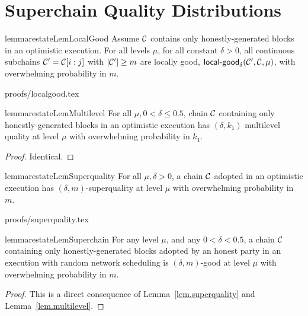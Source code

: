 \section{Superchain Quality Distributions}

\begin{restatable}{lemma}{restateLemLocalGood}
\label{lem.localgood}
Assume $\mathcal{C}$ contains only honestly-generated blocks in an optimistic
execution. For all levels $\mu$, for all constant $\delta > 0$, all continuous
subchains $\mathcal{C}' = \mathcal{C}[i:j]$ with $|\mathcal{C}'| \geq m$ are locally good,
$\textsf{local-good}_{\delta}(\mathcal{C}', \mathcal{C}, \mu)$, with overwhelming
probability in $m$.
\end{restatable}
\ifonecolumn
{proofs/localgood.tex}
\fi

\begin{restatable}{lemma}{restateLemMultilevel}
\label{lem.multilevel}
For all $\mu, 0 < \delta \leq 0.5$, chain $\mathcal{C}$ containing only
honestly-generated blocks in an optimistic execution has $(\delta, k_1)$
multilevel quality at level $\mu$ with overwhelming probability in $k_1$.
\end{restatable}
\ifonecolumn
\begin{proof}
Identical.
\Qed
\end{proof}
\else
\fi

\begin{restatable}[Superquality]{lemma}{restateLemSuperquality}
\label{lem.superquality}
For all $\mu, \delta > 0$, a chain $\mathcal{C}$ adopted in an optimistic execution
has $(\delta, m)$-superquality at level $\mu$ with overwhelming probability in
$m$.
\end{restatable}
\ifonecolumn
{proofs/superquality.tex}
\fi

\begin{restatable}{lemma}{restateLemSuperchain}
\label{lem.superchain-distribution}
For any level $\mu$, and any $0 < \delta < 0.5$, a chain
$\mathcal{C}$ containing only honestly-generated blocks adopted by an honest party in
an execution with random network scheduling is $(\delta, m)$-good at level
$\mu$ with overwhelming probability in $m$.
\end{restatable}
\ifonecolumn
\begin{proof}
This is a direct consequence of Lemma~\ref{lem.superquality} and
Lemma~\ref{lem.multilevel}. \Qed
\end{proof}
\fi
